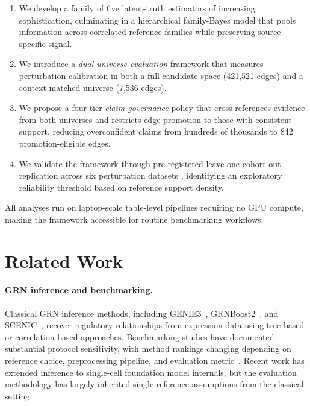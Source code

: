 \documentclass[11pt,a4paper]{article}
\begin{document}
\begin{enumerate}
  \item We develop a family of five latent-truth estimators of increasing sophistication, culminating in a hierarchical family-Bayes model that pools information across correlated reference families while preserving source-specific signal.
  \item We introduce a \emph{dual-universe evaluation} framework that measures perturbation calibration in both a full candidate space (421,521 edges) and a context-matched universe (7,536 edges). 
  \item We propose a four-tier \emph{claim governance} policy that cross-references evidence from both universes and restricts edge promotion to those with consistent support, reducing overconfident claims from hundreds of thousands to 842 promotion-eligible edges. 
  \item We validate the framework through pre-registered leave-one-cohort-out replication across six perturbation datasets , identifying an exploratory reliability threshold based on reference support density.
\end{enumerate}

All analyses run on laptop-scale table-level pipelines requiring no GPU compute, making the framework accessible for routine benchmarking workflows.

\section{Related Work}\label{sec:related}

\paragraph{GRN inference and benchmarking.}
Classical GRN inference methods, including GENIE3~\citep{huynh2010inferring}, GRNBoost2~\citep{moerman2019grnboost2}, and SCENIC~\citep{aibar2017scenic}, recover regulatory relationships from expression data using tree-based or correlation-based approaches.
Benchmarking studies have documented substantial protocol sensitivity, with method rankings changing depending on reference choice, preprocessing pipeline, and evaluation metric~\citep{pratapa2020benchmarking}.
Recent work has extended inference to single-cell foundation model internals, but the evaluation methodology has largely inherited single-reference assumptions from the classical setting.
\end{document}

